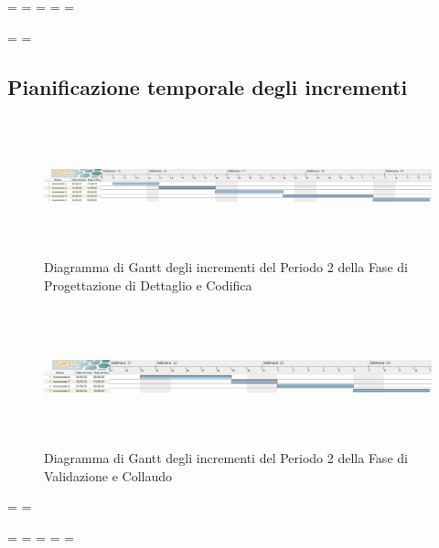 \newpage
\paperwidth=\pdfpageheight
\paperheight=\pdfpagewidth
\pdfpageheight=\paperheight
\pdfpagewidth=\paperwidth
\headwidth=\textheight

\begingroup 
\vsize=\textwidth
\hsize=\textheight

\subsection{Pianificazione temporale degli incrementi}
\pagestyle{empty}
\begin{figure}[h]
	\centering
	\includegraphics[height = 4cm, width = 24.5cm]{Sezioni/DiagrammiGantt/PianificazioneTemporaleIncrementi.png}
	\caption{Diagramma di Gantt degli incrementi del Periodo 2 della Fase di Progettazione di Dettaglio e Codifica}
\end{figure}

\begin{figure}[h]
	\centering
	\includegraphics[height = 4cm, width = 24.5cm]{Sezioni/DiagrammiGantt/PianificazioneTemporaleIncrementi2.png}
	\caption{Diagramma di Gantt degli incrementi del Periodo 2 della Fase di Validazione e Collaudo}
\end{figure}

\textwidth=\hsize
\textheight=\vsize

\endgroup
\newpage
\paperwidth=\pdfpageheight
\paperheight=\pdfpagewidth
\pdfpageheight=\paperheight
\pdfpagewidth=\paperwidth
\headwidth=\textwidth